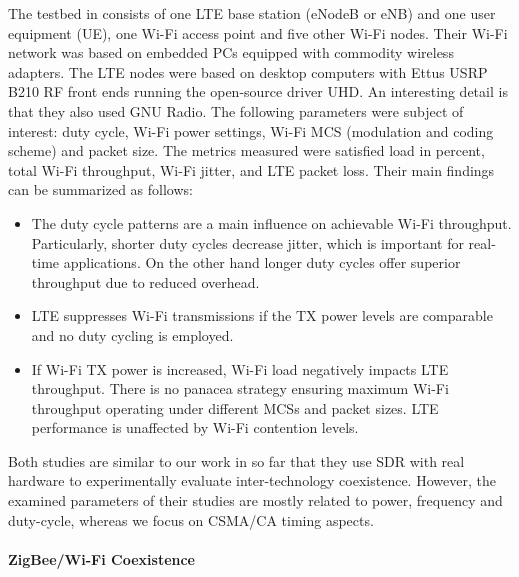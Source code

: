The testbed in\cite{capretti16} consists of one LTE base station (eNodeB or eNB) and one user equipment (UE), one Wi-Fi access point and five other Wi-Fi nodes. Their Wi-Fi network was based on embedded PCs equipped with commodity wireless adapters. The LTE nodes were based on desktop computers with Ettus USRP B210 RF front ends running the open-source driver UHD. An interesting detail is that they also used GNU Radio. The following parameters were subject of interest: duty cycle, Wi-Fi power settings, Wi-Fi MCS (modulation and coding scheme) and packet size. The metrics measured were satisfied load in percent, total Wi-Fi throughput, Wi-Fi jitter, and LTE packet loss.  Their main findings can be summarized as follows: 
\begin{itemize}
	\item The duty cycle patterns are a main influence on achievable Wi-Fi throughput. Particularly, shorter duty cycles decrease jitter, which is important for real-time applications. On the other hand longer duty cycles offer superior throughput due to reduced overhead.
	\item LTE suppresses Wi-Fi transmissions if the TX power levels are comparable and no duty cycling is employed.
	\item If Wi-Fi TX power is increased, Wi-Fi load negatively impacts LTE throughput. There is no panacea strategy ensuring maximum Wi-Fi throughput operating under different MCSs and packet sizes. LTE performance is unaffected by Wi-Fi contention levels.
\end{itemize}

Both studies are similar to our work in so far that they use SDR with real hardware to experimentally evaluate inter-technology coexistence. However, the examined parameters of their studies are mostly related to power, frequency and duty-cycle, whereas we focus on CSMA/CA timing aspects.

\paragraph{ZigBee/Wi-Fi Coexistence}

